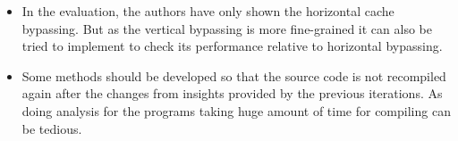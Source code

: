 \documentclass[20pt]{letter}
\begin{document}
\begin{enumerate}
{\begin{itemize}
    \item In the evaluation, the authors have only shown the horizontal cache bypassing. But as the vertical bypassing is more fine-grained it can also be tried to implement to check its performance relative to horizontal bypassing.\\

    \item Some methods should be developed so that the source code is not recompiled again after the changes from insights provided by the previous iterations. As doing analysis for the programs taking huge amount of time for compiling can be tedious. 
\end{itemize}
}

\end{enumerate}
\end{document}

